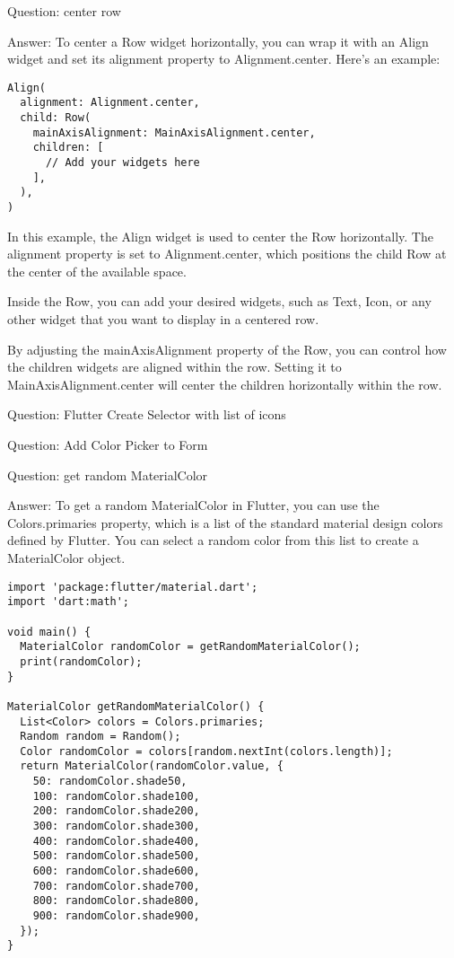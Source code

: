 Question: center row

Answer: To center a Row widget horizontally, you can wrap it with an Align widget and set its alignment 
property to Alignment.center. Here's an example:

\begin{lstlisting}
Align(
  alignment: Alignment.center,
  child: Row(
    mainAxisAlignment: MainAxisAlignment.center,
    children: [
      // Add your widgets here
    ],
  ),
)
\end{lstlisting}

In this example, the Align widget is used to center the Row horizontally. The alignment property is set to 
Alignment.center, which positions the child Row at the center of the available space.

Inside the Row, you can add your desired widgets, such as Text, Icon, or any other widget that you want to display 
in a centered row.

By adjusting the mainAxisAlignment property of the Row, you can control how the children widgets are aligned within 
the row. Setting it to MainAxisAlignment.center will center the children horizontally within the row.

Question: Flutter Create Selector with list of icons

Question: Add Color Picker to Form

Question: get random MaterialColor

Answer: To get a random MaterialColor in Flutter, you can use the Colors.primaries property, which is a list of 
the standard material design colors defined by Flutter. You can select a random color from this list to create
a MaterialColor object.

\begin{lstlisting}
import 'package:flutter/material.dart';
import 'dart:math';

void main() {
  MaterialColor randomColor = getRandomMaterialColor();
  print(randomColor);
}

MaterialColor getRandomMaterialColor() {
  List<Color> colors = Colors.primaries;
  Random random = Random();
  Color randomColor = colors[random.nextInt(colors.length)];
  return MaterialColor(randomColor.value, {
    50: randomColor.shade50,
    100: randomColor.shade100,
    200: randomColor.shade200,
    300: randomColor.shade300,
    400: randomColor.shade400,
    500: randomColor.shade500,
    600: randomColor.shade600,
    700: randomColor.shade700,
    800: randomColor.shade800,
    900: randomColor.shade900,
  });
}
\end{lstlisting}

